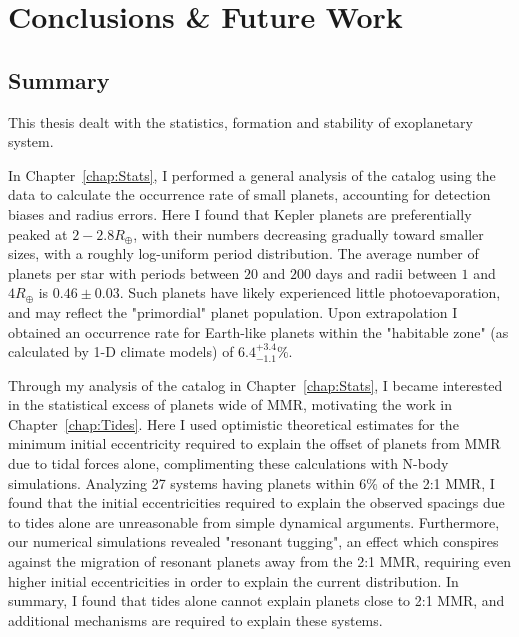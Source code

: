 \chapter{Conclusions \& Future Work}
\section{Summary}
This thesis dealt with the statistics, formation and stability of exoplanetary system. 

In Chapter~\ref{chap:Stats}, I performed a general analysis of the \kep catalog using the \citet{Ramirez2014} data to calculate the occurrence rate of small planets, accounting for detection biases and radius errors. 
Here I found that Kepler planets are preferentially peaked at $2-2.8R_\oplus$, with their numbers decreasing gradually toward smaller sizes, with a roughly log-uniform period distribution.
The average number of planets per star with periods between $20$ and $200$ days and radii between $1$ and $4R_\oplus$ is $0.46 \pm 0.03$. 
Such planets have likely experienced little photoevaporation, and may reflect the "primordial" planet population. 
Upon extrapolation I obtained an occurrence rate for Earth-like planets within the "habitable zone" (as calculated by 1-D climate models) of $6.4^{+3.4}_{-1.1}\%$. 

Through my analysis of the \kep catalog in Chapter~\ref{chap:Stats}, I became interested in the statistical excess of planets wide of MMR, motivating the work in Chapter~\ref{chap:Tides}.
Here I used optimistic theoretical estimates for the minimum initial eccentricity required to explain the offset of \kep planets from MMR due to tidal forces alone, complimenting these calculations with N-body simulations.
Analyzing 27 \kep systems having planets within $6\%$ of the 2:1 MMR, I found that the initial eccentricities required to explain the observed spacings due to tides alone are unreasonable from simple dynamical arguments.
Furthermore, our numerical simulations revealed "resonant tugging", an effect which conspires against the migration of resonant planets away from the 2:1 MMR, requiring even higher initial eccentricities in order to explain the current \kep distribution. 
In summary, I found that tides alone cannot explain planets close to 2:1 MMR, and additional mechanisms are required to explain these systems. 

